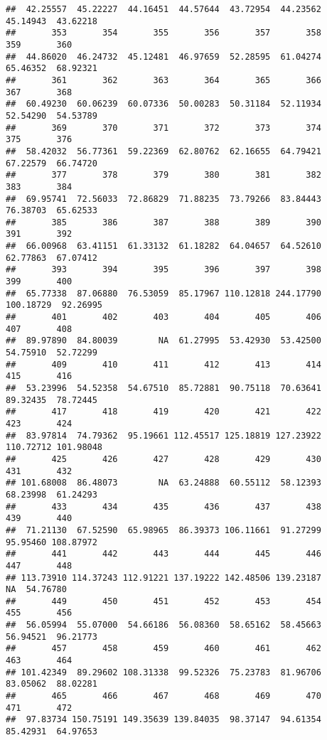 \documentclass[
]{article}
\begin{document}
\begin{verbatim}
##  42.25557  45.22227  44.16451  44.57644  43.72954  44.23562  45.14943  43.62218 
##       353       354       355       356       357       358       359       360 
##  44.86020  46.24732  45.12481  46.97659  52.28595  61.04274  65.46352  68.92321 
##       361       362       363       364       365       366       367       368 
##  60.49230  60.06239  60.07336  50.00283  50.31184  52.11934  52.54290  54.53789 
##       369       370       371       372       373       374       375       376 
##  58.42032  56.77361  59.22369  62.80762  62.16655  64.79421  67.22579  66.74720 
##       377       378       379       380       381       382       383       384 
##  69.95741  72.56033  72.86829  71.88235  73.79266  83.84443  76.38703  65.62533 
##       385       386       387       388       389       390       391       392 
##  66.00968  63.41151  61.33132  61.18282  64.04657  64.52610  62.77863  67.07412 
##       393       394       395       396       397       398       399       400 
##  65.77338  87.06880  76.53059  85.17967 110.12818 244.17790 100.18729  92.26995 
##       401       402       403       404       405       406       407       408 
##  89.97890  84.80039        NA  61.27995  53.42930  53.42500  54.75910  52.72299 
##       409       410       411       412       413       414       415       416 
##  53.23996  54.52358  54.67510  85.72881  90.75118  70.63641  89.32435  78.72445 
##       417       418       419       420       421       422       423       424 
##  83.97814  74.79362  95.19661 112.45517 125.18819 127.23922 110.72712 101.98048 
##       425       426       427       428       429       430       431       432 
## 101.68008  86.48073        NA  63.24888  60.55112  58.12393  68.23998  61.24293 
##       433       434       435       436       437       438       439       440 
##  71.21130  67.52590  65.98965  86.39373 106.11661  91.27299  95.95460 108.87972 
##       441       442       443       444       445       446       447       448 
## 113.73910 114.37243 112.91221 137.19222 142.48506 139.23187        NA  54.76780 
##       449       450       451       452       453       454       455       456 
##  56.05994  55.07000  54.66186  56.08360  58.65162  58.45663  56.94521  96.21773 
##       457       458       459       460       461       462       463       464 
## 101.42349  89.29602 108.31338  99.52326  75.23783  81.96706  83.05062  88.02281 
##       465       466       467       468       469       470       471       472 
##  97.83734 150.75191 149.35639 139.84035  98.37147  94.61354  85.42931  64.97653 

\end{verbatim}
\end{document}
